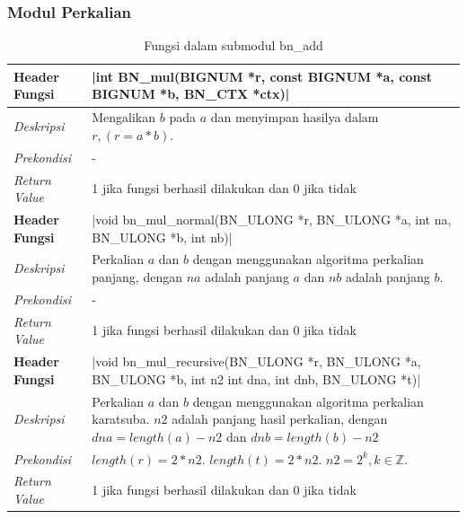 \subsubsection{Modul Perkalian}
\begin{table}[h]
  \caption{Fungsi dalam submodul bn\_add}
  \begin{tabular}{R{2.5cm}L{10.5cm}}
\toprule
\textbf{Header Fungsi} & |int BN_mul(BIGNUM *r, const BIGNUM *a, const BIGNUM *b, BN_CTX *ctx)|    \\ \midrule
\textit{Deskripsi}     & Mengalikan $b$ pada $a$ dan menyimpan hasilya dalam $r, (r = a * b)$. \\
\textit{Prekondisi}    & - \\
\textit{Return Value}  & 1 jika fungsi berhasil dilakukan dan 0 jika tidak
 \\ \bottomrule
\textbf{Header Fungsi} & |void bn_mul_normal(BN_ULONG *r, BN_ULONG *a, int na, BN_ULONG *b, int nb)|    \\ \midrule
\textit{Deskripsi}     &  Perkalian $a$ dan $b$ dengan menggunakan algoritma perkalian panjang, dengan $na$ adalah panjang $a$ dan $nb$ adalah panjang $b$.\\
\textit{Prekondisi}    &  -\\
\textit{Return Value}  & 1 jika fungsi berhasil dilakukan dan 0 jika tidak
 \\ \bottomrule
\textbf{Header Fungsi} & |void bn_mul_recursive(BN_ULONG *r, BN_ULONG *a, BN_ULONG *b, int n2 int dna, int dnb, BN_ULONG *t)|    \\ \midrule
\textit{Deskripsi}     &  Perkalian $a$ dan $b$ dengan menggunakan algoritma perkalian karatsuba. $n2$ adalah panjang hasil perkalian, dengan $dna = length(a) - n2$ dan $dnb = length(b) - n2$\\
\textit{Prekondisi}    & $length(r) = 2*n2$. $ length(t) = 2*n2$. $n2 = 2^k, k \in \mathbb{Z}. $\\
\textit{Return Value}  & 1 jika fungsi berhasil dilakukan dan 0 jika tidak
 \\ \bottomrule
\end{tabular}

\end{table}

